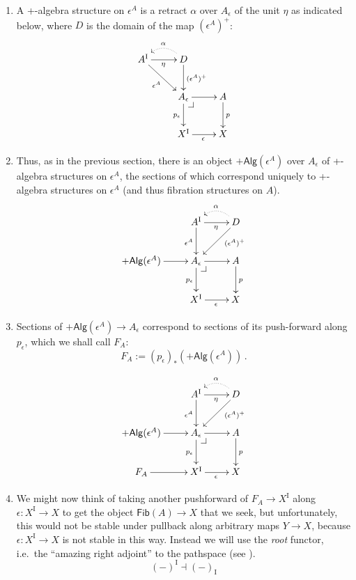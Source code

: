 \documentclass[11pt]{article}
\makeatletter
\newcommand{\pbcorner}[1][dr]{\save*!/#1-1.2pc/#1:(-1,1)@^{|-}\restore}
\newcommand{\ra}{\ensuremath{\rightarrow}}
\newcommand{\I}{\ensuremath{\mathrm{I}}}
\newcommand{\Fib}{\ensuremath{\mathsf{Fib}}}
\theoremstyle{remark}
\theoremstyle{definition}
\makeatother
\begin{document}
\begin{enumerate}
\item A +-algebra structure on $\epsilon^A$ is a retract $\alpha$ over $A_\epsilon$ of the unit $\eta$ as indicated below, where $D$ is the domain of the map $(\epsilon^A)^+$:
\begin{equation}\label{diagram:fibU3}
\xymatrix{
A^\I \ar[rd]_{\epsilon^A} \ar[r]_\eta & \ar@{.>}@/_1pc/[l]_\alpha D \ar[d]^{(\epsilon^A)^+} & \\
& A_\epsilon\ar[d]_{p_\epsilon} \ar[r] \pbcorner & A \ar[d]^{p} \\
& X^\I \ar[r]_{\epsilon} &  X 
}
\end{equation}

\item Thus, as in the previous section, there is an object $+\mathsf{Alg}(\epsilon^A)$ over  $A_\epsilon$ of +-algebra structures on $\epsilon^A$, the sections of which correspond uniquely to +-algebra structures on $\epsilon^A$ (and thus fibration structures on $A$).
\begin{equation}\label{diagram:fibU4}
\xymatrix{
&A^\I \ar[d]_{\epsilon^A} \ar[r]_\eta & \ar@{.>}@/_1pc/[l]_\alpha D \ar[ld]^<<<<<{(\epsilon^A)^+}  \\
+\mathsf{Alg}(\epsilon^A) \ar[r] & A_\epsilon\ar[d]_{p_\epsilon} \ar[r] \pbcorner & A \ar[d]^{p} \\
& X^\I \ar[r]_{\epsilon} &  X 
}
\end{equation}

\item Sections of $+\mathsf{Alg}(\epsilon^A)\ra A_\epsilon$ correspond to sections of its push-forward along $p_\epsilon$, which we shall call $F_A$: 
\[
F_A := (p_\epsilon)_*(+\mathsf{Alg}(\epsilon^A))\,.
\]

\begin{equation}\label{diagram:fibU5}
\xymatrix{
&A^\I \ar[d]_{\epsilon^A} \ar[r]_\eta & \ar@{.>}@/_1pc/[l]_\alpha D \ar[ld]^<<<<<{(\epsilon^A)^+}  \\
+\mathsf{Alg}(\epsilon^A) \ar[r] & A_\epsilon\ar[d]_{p_\epsilon} \ar[r] \pbcorner & A \ar[d]^{p} \\
F_A \ar[r] & X^\I \ar[r]_{\epsilon} &  X 
}
\end{equation}

\item We might now think of taking another pushforward of $F_A \ra X^\I$ along $\epsilon : X^\I\ra X$ to get the object $\Fib(A) \ra X$ that we seek, but unfortunately, this would not be stable under pullback along arbitrary maps $Y\ra X$, because $\epsilon : X^\I\ra X$ is not stable in this way.  Instead we will use the \emph{root} functor, i.e.\ the ``amazing right adjoint'' to the pathspace  (see \cite{A:cubicalnotes}). $$(-)^\I \dashv (-)_\I$$


\end{enumerate}
\end{document}
